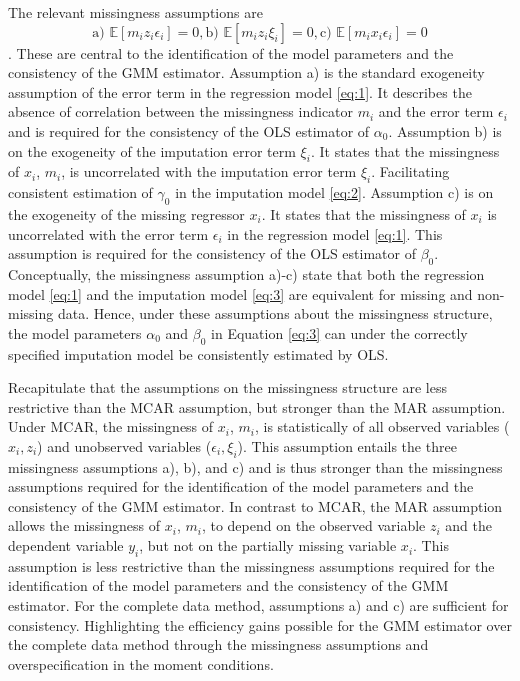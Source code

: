The relevant missingness assumptions are $$\text{a) }\mathbb{E}[m_i z_i \epsilon_i] = 0, \text{b) }\mathbb{E}[m_i z_i \xi_i] = 0, \text{c) }\mathbb{E}[m_i x_i \epsilon_i] = 0$$.
These are central to the identification of the model parameters and the consistency of the GMM estimator.
Assumption a) is the standard exogeneity assumption of the error term in the regression model \eqref{eq:1}.
It describes the absence of correlation between the missingness indicator $m_i$ and the error term $\epsilon_i$ and is required for the consistency of the OLS estimator of $\alpha_0$.
Assumption b) is on the exogeneity of the imputation error term $\xi_i$.
It states that the missingness of $x_i$, $m_i$, is uncorrelated with the imputation error term $\xi_i$.
Facilitating consistent estimation of $\gamma_0$ in the imputation model \eqref{eq:2}.
Assumption c) is on the exogeneity of the missing regressor $x_i$.
It states that the missingness of $x_i$ is uncorrelated with the error term $\epsilon_i$ in the regression model \eqref{eq:1}.
This assumption is required for the consistency of the OLS estimator of $\beta_0$.
Conceptually, the missingness assumption a)-c) state that both the regression model \eqref{eq:1} and the imputation model \eqref{eq:3} are equivalent for missing and non-missing data.
Hence, under these assumptions about the missingness structure, the model parameters $\alpha_0$ and $\beta_0$ in Equation \eqref{eq:3} can under the correctly specified imputation model be consistently estimated by OLS.

Recapitulate that the assumptions on the missingness structure are less restrictive than the MCAR assumption, but stronger than the MAR assumption.
Under MCAR, the missingness of $x_i$, $m_i$, is statistically of all observed variables ($x_i, z_i$) and unobserved variables ($\epsilon_i, \xi_i$).
This assumption entails the three missingness assumptions a), b), and c) and is thus stronger than the missingness assumptions required for the identification of the model parameters and the consistency of the GMM estimator.
In contrast to MCAR, the MAR assumption allows the missingness of $x_i$, $m_i$, to depend on the observed variable $z_i$ and the dependent variable $y_i$, but not on the partially missing variable $x_i$.
This assumption is less restrictive than the missingness assumptions required for the identification of the model parameters and the consistency of the GMM estimator.
For the complete data method, assumptions a) and c) are sufficient for consistency.
Highlighting the efficiency gains possible for the GMM estimator over the complete data method through the missingness assumptions and overspecification in the moment conditions.

